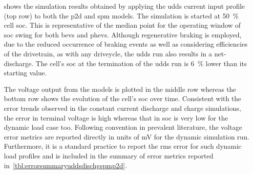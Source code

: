   shows   the  simulation  results   obtained  by
applying the  \gls{udds} current input profile  (top row) to both  the \gls{p2d}
and  \gls{spm}  models. The  simulation  is  started at  \SI{50}{\percent}  cell
\gls{soc}. This is  representative of the median point for  the operating window
of \gls{soc} swing for both  \glspl{bev} and \glspl{phev}. Although regenerative
braking is  employed, due to  the reduced occurrence  of braking events  as well
as  considering efficiencies  of  the  drivetrain, as  with  any driveycle,  the
\gls{udds} run  also results  in a  net-discharge. The  cell's \gls{soc}  at the
termination  of the  \gls{udds} run  is \approx\SI{6}{\percent}  lower than  its
starting value.

The  voltage  output from  the  models  is plotted  in  the  middle row  whereas
the  bottom  row  shows  the  evolution  of  the  cell's  \gls{soc}  over  time.
Consistent with the error trends observed  in the constant current discharge and
charge  simulations, the  error  in terminal  voltage is  high  whereas that  in
\gls{soc} is  very low for  the dynamic load  case too. Following  convention in
prevalent  literature,  the  voltage  error metrics  are  reported  directly  in
units  of  \si{\milli\volt} for  the  dynamic  simulation run.  Furthermore,  it
is  a  standard  practice  to  report  the  \gls{rms}  error  for  such  dynamic
load  profiles  and  is  included  in the  summary  of  error  metrics  reported
in~\cref{tbl:errorsummaryuddsdischgspmp2d}.




